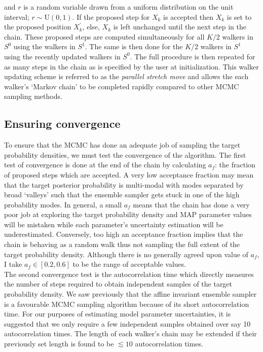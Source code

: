 \noindent and $r$ is a random variable drawn from a uniform distribution on the 
unit interval; $r \sim \mathrm{U}(0,1)$. If the proposed step for $X_k$ is accepted then $X_k$ is 
set to the proposed position $X_k^{'}$, else, $X_k$ is left unchanged until the next 
step in the chain. These proposed steps are computed simultaneously for all $K/2$ walkers 
in $S^0$ using the walkers in $S^1$. 
The same is then done for the $K/2$ walkers in $S^1$ using the recently updated walkers in 
$S^0$. The full procedure 
is then repeated for as many steps in the chain as is specified by the user at 
initialization. This walker updating 
scheme is referred to as the \emph{parallel stretch move} 
and allows the each walker's `Markov 
chain' to be completed rapidly compared to other MCMC sampling methods. \\

\subsection{Ensuring convergence}
To ensure that the MCMC has done an adequate job of sampling the target probability 
densities, we must test the convergence of the algorithm. 
The first test of convergence is done at the end of the chain by calculating $a_f$: the 
fraction of proposed steps which are accepted. A very low acceptance fraction 
may mean that the target posterior probability is multi-modal with modes separated by 
broad `valleys' such that the ensemble sampler gets stuck in one of the high probability 
modes. In general, a small $a_f$ means 
that the chain has done a very poor job at exploring the target probability 
density and MAP parameter values will be mistaken while each parameter's uncertainty 
estimation will be underestimated. Conversely, 
too high an acceptance fraction implies that the chain is behaving as a random walk thus 
not sampling the full extent of the 
target probability density. Although there is no generally agreed upon 
value of $a_f$, I take $a_f \in [0.2,0.6]$ to be the range of acceptable values. \\

The second convergence 
test is the autocorrelation time which directly measures the number of steps 
required to obtain independent samples of the target probability density. We saw previously 
that the affine invariant ensemble sampler is a favourable MCMC sampling algorithm because 
of its short autocorrelation time. For our purposes of estimating model parameter 
uncertainties, it is suggested that we only require a few independent samples obtained 
over say 10 autocorrelation times. The length of each walker's chain may be extended 
if their previously set length is found to be $\lesssim 10$ autocorrelation times.

